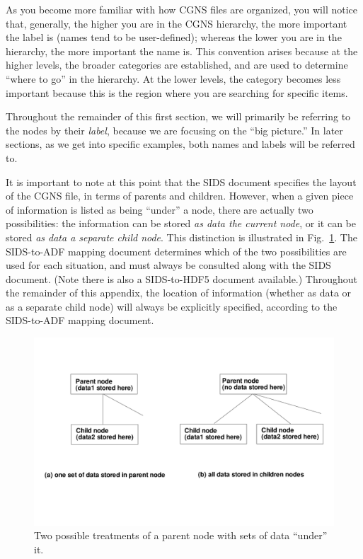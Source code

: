 \documentclass[12pt]{article}
\begin{document}
As you become more familiar with how CGNS files are
organized, you will notice that,
generally, the higher you are in the CGNS hierarchy, the more
important the label is (names tend to be user-defined); whereas
the lower you are in the hierarchy, the more important the
name is.  This convention arises because at the higher levels,
the broader categories are established, and are used to determine
``where to go'' in the hierarchy.   At the lower levels, the category becomes
less important because this is the region where you are
searching for specific items.

Throughout the remainder of this
first section, we will primarily be referring to the nodes by their
{\it label}, because we are focusing on the ``big picture.''
In later sections, as we get into specific examples,
both names and labels will be referred to.

It is important to note at this point that the SIDS document
specifies the layout of the CGNS file, in terms of parents
and children.  However, when a given piece of information is
listed as being ``under'' a node, there are actually two possibilities:
the information can be stored {\it as data  the current node},
or it can be stored {\it as data  a separate child node}.
This distinction is illustrated in Fig.~\ref{FIGdataorchild}.  
The SIDS-to-ADF
mapping document \cite{CGNS2} determines which of the two
possibilities are used for each situation, and must always be
consulted along with the SIDS document.  (Note there is also a SIDS-to-HDF5
document available.) Throughout the remainder
of this appendix, the location of information (whether
as data or as a separate child node) will always be explicitly
specified, according to the SIDS-to-ADF mapping document.

\begin{figure}[hpbt]
\centerline{{\includegraphics[width=150mm]{figures/dataorchild}}}
\caption{Two possible treatments of a parent node with sets
of data ``under'' it.}
\label{FIGdataorchild}
\end{figure}
%
\end{document}
